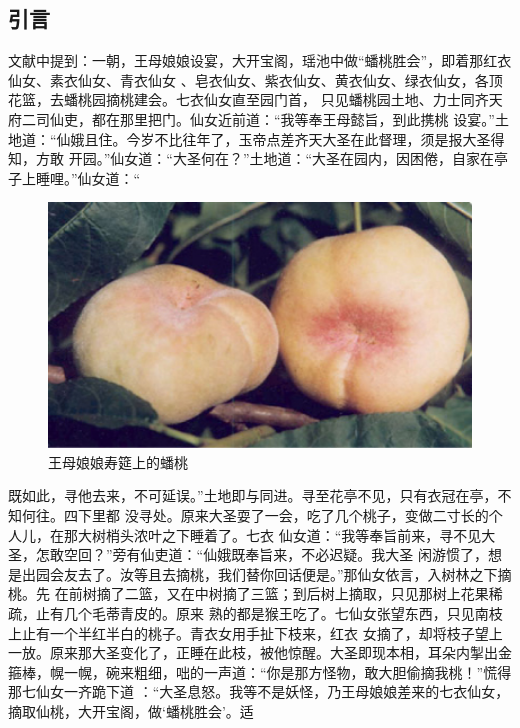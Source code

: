 \documentclass[UTF8,a4paper,11pt,onecolumn,twoside]{ctexart}
\begin{document}
\begin{multicols}{2}
\section{引言}
文献\supercite{Wu,Xuan}中提到：一朝，王母娘娘设宴，大开宝阁，瑶池中做“蟠桃胜会”，即着那红衣仙女、素衣仙女、青衣仙女
、皂衣仙女、紫衣仙女、黄衣仙女、绿衣仙女，各顶花篮，去蟠桃园摘桃建会。七衣仙女直至园门首，
只见蟠桃园土地、力士同齐天府二司仙吏，都在那里把门。仙女近前道：“我等奉王母懿旨，到此携桃
设宴。”土地道：“仙娥且住。今岁不比往年了，玉帝点差齐天大圣在此督理，须是报大圣得知，方敢
开园。”仙女道：“大圣何在？”土地道：“大圣在园内，因困倦，自家在亭子上睡哩。”仙女道：“
\begin{figure}
	\centering
	\includegraphics[width=12cm]{Pantao.jpg}
	\caption{王母娘娘寿筵上的蟠桃}\label{fig2}
\end{figure}
既如此，寻他去来，不可延误。”土地即与同进。寻至花亭不见，只有衣冠在亭，不知何往。四下里都
没寻处。原来大圣耍了一会，吃了几个桃子，变做二寸长的个人儿，在那大树梢头浓叶之下睡着了。七衣
仙女道：“我等奉旨前来，寻不见大圣，怎敢空回？”旁有仙吏道：“仙娥既奉旨来，不必迟疑。我大圣
闲游惯了，想是出园会友去了。汝等且去摘桃，我们替你回话便是。”那仙女依言，入树林之下摘桃。先
在前树摘了二篮，又在中树摘了三篮；到后树上摘取，只见那树上花果稀疏，止有几个毛蒂青皮的。原来
熟的都是猴王吃了。七仙女张望东西，只见南枝上止有一个半红半白的桃子。青衣女用手扯下枝来，红衣
女摘了，却将枝子望上一放。原来那大圣变化了，正睡在此枝，被他惊醒。大圣即现本相，耳朵内掣出金
箍棒，幌一幌，碗来粗细，咄的一声道：“你是那方怪物，敢大胆偷摘我桃！”慌得那七仙女一齐跪下道
：“大圣息怒。我等不是妖怪，乃王母娘娘差来的七衣仙女，摘取仙桃，大开宝阁，做‘蟠桃胜会’。适

\end{multicols}
\end{document}
